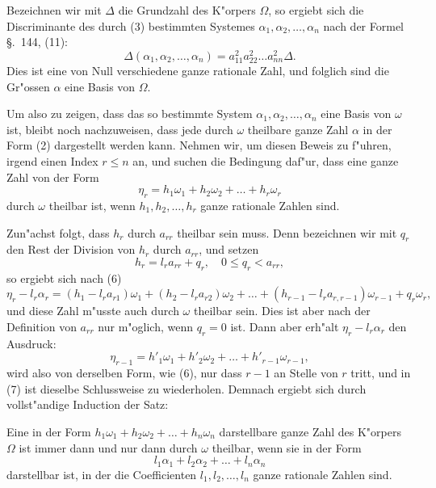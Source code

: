 \documentclass[12pt,a4paper]{article}
\theoremstyle{definition}
\begin{document}
Bezeichnen wir mit $\Delta$ die Grundzahl des K"orpers $\Omega$, so ergiebt sich die Discriminante des durch (3) bestimmten Systemes $\alpha_1, \alpha_2, \dots, \alpha_n$ nach der Formel \S.~144, (11):
\begin{equation}
\Delta(\alpha_1, \alpha_2, \dots, \alpha_n) = a_{11}^2 a_{22}^2 \dots a_{nn}^2 \Delta.
\end{equation}
Dies ist eine von Null verschiedene ganze rationale Zahl, und folglich sind die Gr"ossen $\alpha$ eine Basis von $\Omega$.

Um also zu zeigen, dass das so bestimmte System $\alpha_1, \alpha_2, \dots, \alpha_n$ eine Basis von $\omega$ ist, bleibt noch nachzuweisen, dass jede durch $\omega$ theilbare ganze Zahl $\alpha$ in der Form (2) dargestellt werden kann. Nehmen wir, um diesen Beweis zu f"uhren, irgend einen Index $r \leq n$ an, und suchen die Bedingung daf"ur, dass eine ganze Zahl von der Form
\begin{equation}
\eta_r = h_1\omega_1 + h_2\omega_2 + \dots + h_r\omega_r
\end{equation}
durch $\omega$ theilbar ist, wenn $h_1, h_2, \dots, h_r$ ganze rationale Zahlen sind.

Zun"achst folgt, dass $h_r$ durch $a_{rr}$ theilbar sein muss. Denn bezeichnen wir mit $q_r$ den Rest der Division von $h_r$ durch $a_{rr}$, und setzen
\begin{equation}
h_r = l_r a_{rr} + q_r, \quad 0 \leq q_r < a_{rr},
\end{equation}
so ergiebt sich nach (6)
\begin{equation}
\eta_r - l_r\alpha_r = (h_1 - l_r a_{r1})\omega_1 + (h_2 - l_r a_{r2})\omega_2 + \dots + (h_{r-1} - l_r a_{r,r-1})\omega_{r-1} + q_r\omega_r,
\end{equation}
und diese Zahl m"usste auch durch $\omega$ theilbar sein. Dies ist aber nach der Definition von $a_{rr}$ nur m"oglich, wenn $q_r = 0$ ist. Dann aber erh"alt $\eta_r - l_r\alpha_r$ den Ausdruck:
\begin{equation}
\eta_{r-1} = h'_1\omega_1 + h'_2\omega_2 + \dots + h'_{r-1}\omega_{r-1},
\end{equation}
wird also von derselben Form, wie (6), nur dass $r-1$ an Stelle von $r$ tritt, und in (7) ist dieselbe Schlussweise zu wiederholen. Demnach ergiebt sich durch vollst"andige Induction der Satz:

Eine in der Form $h_1\omega_1 + h_2\omega_2 + \dots + h_n\omega_n$ darstellbare ganze Zahl des K"orpers $\Omega$ ist immer dann und nur dann durch $\omega$ theilbar, wenn sie in der Form
\begin{equation}
l_1\alpha_1 + l_2\alpha_2 + \dots + l_n\alpha_n
\end{equation}
darstellbar ist, in der die Coefficienten $l_1, l_2, \dots, l_n$ ganze rationale Zahlen sind.
\end{document}

